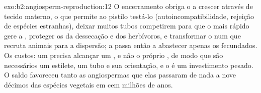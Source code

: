 \begin{solution}{exo:b2:angiosperm-reproduction:12}
O encerramento obriga o  a crescer através de tecido materno, o
que permite ao pistilo testá-lo (autoincompatibilidade, rejeição de
espécies estranhas), deixar muitos tubos competirem para que o mais
rápido gere a , proteger os  da dessecação e dos
herbívoros, e transformar o  num  que recruta animais para
a dispersão; a  passa então a abastecer apenas os
 fecundados. Os custos: um  precisa alcançar um
, e não o próprio , de modo que são necessários um
estilete, um tubo e sua orientação, e o  é um investimento
pesado. O saldo favoreceu tanto as angiospermas que elas passaram de
nada a nove décimos das espécies vegetais em cem milhões de anos.
\end{solution}

